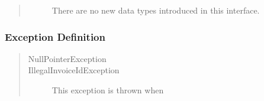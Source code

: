 \begin{quote}
	\begin{description}
		\item[]There are no new data types introduced in this interface. 
	\end{description} 
\end{quote}

\subsubsection{Exception Definition} 

\begin{quote}
	\begin{description}
		\item[NullPointerException] 
		\item[IllegalInvoiceIdException] This exception is thrown when 
	\end{description} 
\end{quote}